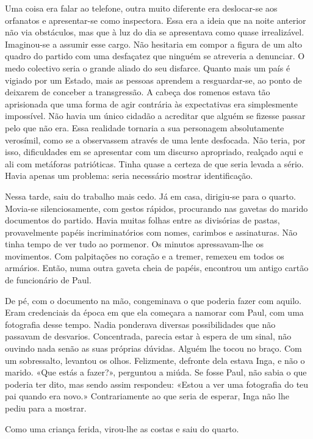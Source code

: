 Uma coisa era falar ao telefone, outra muito diferente era deslocar-se
aos orfanatos e apresentar-se como inspectora. Essa era a ideia que na
noite anterior não via obstáculos, mas que à luz do dia se apresentava
como quase irrealizável. Imaginou-se a assumir esse cargo. Não hesitaria em compor a figura de um alto quadro do partido com uma desfaçatez
que ninguém se atreveria a denunciar. O medo colectivo seria o grande
aliado do seu disfarce. Quanto mais um país é vigiado por um Estado,
mais as pessoas aprendem a resguardar-se, ao ponto de deixarem de
conceber a transgressão. A cabeça dos romenos estava tão aprisionada que
uma forma de agir contrária às expectativas era simplesmente
impossível. Não havia um único cidadão a acreditar que alguém se fizesse
passar pelo que não era. Essa realidade tornaria a sua personagem
absolutamente verosímil, como se a observassem através de uma lente desfocada.
Não teria, por isso, dificuldades em se apresentar com um discurso
apropriado, realçado aqui e ali com metáforas patrióticas. Tinha quase a
certeza de que seria levada a sério. Havia apenas um problema: seria
necessário mostrar identificação.

Nessa tarde, saiu do trabalho mais cedo. Já em casa, dirigiu-se para o
quarto. Movia-se silenciosamente, com gestos rápidos, procurando nas
gavetas do marido documentos do partido. Havia muitas folhas entre as
divisórias de pastas, provavelmente papéis incriminatórios com nomes,
carimbos e assinaturas. Não tinha tempo de ver tudo ao pormenor. Os
minutos apressavam-lhe os movimentos. Com palpitações no coração e a
tremer, remexeu em todos os armários. Então, numa outra gaveta cheia de
papéis, encontrou um antigo cartão de funcionário de Paul.

De pé, com o documento na mão, congeminava o que poderia fazer com
aquilo. Eram credenciais da época em que ela começara a namorar com
Paul, com uma fotografia desse tempo. Nadia ponderava diversas
possibilidades que não passavam de desvarios. Concentrada, parecia estar
à espera de um sinal, não ouvindo nada senão as suas próprias dúvidas.
Alguém lhe tocou no braço. Com um sobressalto, levantou os olhos.
Felizmente, defronte dela estava Inga, e não o marido. «Que estás a
fazer?», perguntou a miúda. Se fosse Paul, não sabia o que poderia ter
dito, mas sendo assim respondeu: «Estou a ver uma fotografia do teu pai
quando era novo.» Contrariamente ao que seria de esperar, Inga não lhe
pediu para a mostrar.


Como uma criança ferida, virou-lhe as costas e saiu do quarto.

